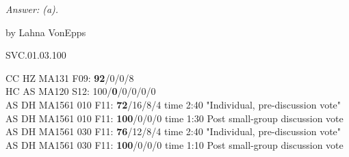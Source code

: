 {\it Answer: (a).}

\medskip
by Lahna VonEpps

SVC.01.03.100

CC HZ MA131 F09: {\bf 92}/0/0/8  \\
HC AS MA120 S12: 100/{\bf0}/0/0/0/0  \\
AS DH MA1561 010 F11: {\bf 72}/16/8/4 time 2:40 "Individual, pre-discussion vote" \\
AS DH MA1561 010 F11: {\bf 100}/0/0/0 time 1:30 Post small-group discussion vote \\
AS DH MA1561 030 F11: {\bf 76}/12/8/4 time 2:40 "Individual, pre-discussion vote" \\
AS DH MA1561 030 F11: {\bf 100}/0/0/0 time 1:10 Post small-group discussion vote \\
